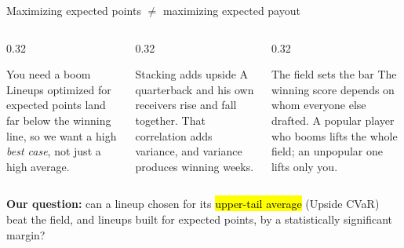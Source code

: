 \begin{frame}{Maximizing expected points $\neq$ maximizing expected payout}
  \begin{columns}[t]
    \begin{column}{0.32\textwidth}
      \begin{block}{You need a boom}
        Lineups optimized for expected points land far below the winning line, so we
        want a high \emph{best case}, not just a high average.
      \end{block}
    \end{column}
    \begin{column}{0.32\textwidth}
      \begin{block}{Stacking adds upside}
        A quarterback and his own receivers rise and fall together. That correlation adds
        variance, and variance produces winning weeks.
      \end{block}
    \end{column}
    \begin{column}{0.32\textwidth}
      \begin{block}{The field sets the bar}
        The winning score depends on whom everyone else drafted. A popular player who
        booms lifts the whole field; an unpopular one lifts only you.
      \end{block}
    \end{column}
  \end{columns}
  \vspace{1.5em}
  \textbf{Our question:} can a lineup chosen for its \hl{upper-tail average} (Upside CVaR)
  beat the field, and lineups built for expected points, by a statistically significant
  margin?
\end{frame}

